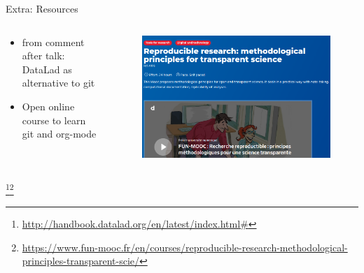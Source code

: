 \documentclass[10pt,aspectratio=169]{beamer}
\begin{document}
\appendix
{}
\setcounter{finalframe}{\value{framenumber}}

\begin{frame}{Extra: Resources}
    \begin{columns}[c]
    \begin{column}{.3\textwidth} %
    \begin{minipage}{1\textwidth}
    \begin{itemize}
        \item from comment after talk: DataLad as alternative to git
        \item Open online course to learn git and org-mode
    \end{itemize}
    \end{minipage}
    \end{column}
    \begin{column}{.7\textwidth} %
    \begin{figure}
        \includegraphics[width=\textwidth]{figures/extra_course.png}
     \end{figure}
    \end{column}
    \end{columns}\footnote{\url{http://handbook.datalad.org/en/latest/index.html#}}\footnote{\url{https://www.fun-mooc.fr/en/courses/reproducible-research-methodological-principles-transparent-scie/}}
\end{frame}
\end{document}
